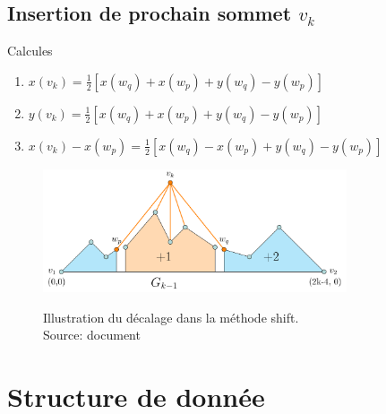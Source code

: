 \documentclass[10pt]{beamer}
\begin{document}
\subsection{Insertion de prochain sommet $v_k$}	
{
\begin{frame}{}
    \begin{block}{Calcules}
		\begin{enumerate}
			\item $x(v_k) = \frac{1}{2} [ x(w_q) + x(w_p) + y(w_q) − y(w_p)]$
			\item $y(v_k) = \frac{1}{2} [ x(w_q) + x(w_p) + y(w_q) − y(w_p)]$
			\item $x(v_k )-x(w_p) = \frac{1}{2} [ x(w_q)−x(w_p)+y(w_q)-y(w_p)]$ 
		\end{enumerate} 
	\end{block}	

    \begin{figure}
		\centering
		\includegraphics[width=0.8\textwidth]{sm0.png}\\[-.2cm]
    \caption[caption]{Illustration du décalage dans la méthode shift. \\\vspace*{0.2cm} Source: document \citeauthor{PhilippKindermann}}	
	\end{figure}

\end{frame}
}


  

\section[Structure de donnée]{Structure de donnée}
\end{document}
